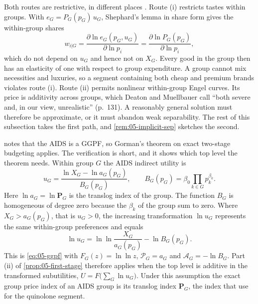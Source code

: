 Both routes are restrictive, in different places \citep[\S 5.2, pp.~130--131]{DeatonMuellbauer1980b}.
Route (i) restricts tastes within groups. With $e_G = P_G(p_G)\,u_G$, Shephard's lemma in share form gives
the within-group shares
\begin{equation*}
  w_{i|G} = \frac{\partial\ln e_G(p_G, u_G)}{\partial\ln p_i} = \frac{\partial\ln P_G(p_G)}{\partial\ln p_i},
\end{equation*}
which do not depend on $u_G$ and hence not on $X_G$. Every good in the group then has an elasticity of
one with respect to group expenditure. A group cannot mix necessities and luxuries, so a segment
containing both cheap and premium brands violates route (i). Route (ii) permits nonlinear within-group
Engel curves. Its price is additivity across groups, which Deaton and Muellbauer call ``both severe and,
in our view, unrealistic'' (p.~131). A reasonably general solution must therefore be approximate, or it
must abandon weak separability. The rest of this subsection takes the first path, and
\cref{rem:05-implicit-sep} sketches the second.

\citet[fn.~17]{Hausman1997} notes that the AIDS is a GGPF, so Gorman's theorem on exact two-stage
budgeting applies. The verification is short, and it shows which top level the theorem needs. Within group
$G$ the AIDS indirect utility is
\begin{equation*}
  u_G = \frac{\ln X_G - \ln a_G(p_G)}{B_G(p_G)}, \qquad B_G(p_G) = \beta_0\prod_{k\in G} p_k^{\beta_k}.
\end{equation*}
Here $\ln a_G = \ln\mathbf{P}_G$ is the translog index of the group. The function $B_G$ is homogeneous
of degree zero because the $\beta_k$ of the group sum to zero. Where $X_G > a_G(p_G)$, that is $u_G > 0$, the
increasing transformation $\ln u_G$ represents the same within-group preferences and equals
\begin{equation*}
  \ln u_G = \ln\ln\frac{X_G}{a_G(p_G)} - \ln B_G(p_G).
\end{equation*}
This is \eqref{eq:05-ggpf} with $F_G(z) = \ln\ln z$, $\mathcal{P}_G = a_G$ and $\mathcal{A}_G = -\ln B_G$.
Part (ii) of \cref{prop:05-first-stage} therefore applies when the top level is additive in the
transformed subutilities, $U = F\bigl(\sum_G \ln u_G\bigr)$. Under this assumption the exact group price
index of an AIDS group is its translog index $\mathbf{P}_G$, the index that
\citet{ChaudhuriGoldbergJia2006} use for the quinolone segment.

